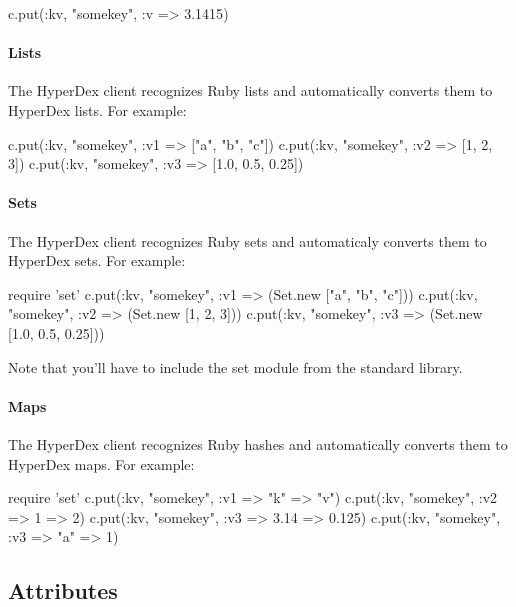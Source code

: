 \begin{rubycode}
c.put(:kv, "somekey", {:v => 3.1415})
\end{rubycode}

\paragraph{Lists}

The HyperDex client recognizes Ruby lists and automatically converts them to
HyperDex lists.  For example:

\begin{rubycode}
c.put(:kv, "somekey", {:v1 => ["a", "b", "c"]})
c.put(:kv, "somekey", {:v2 => [1, 2, 3]})
c.put(:kv, "somekey", {:v3 => [1.0, 0.5, 0.25]})
\end{rubycode}

\paragraph{Sets}

The HyperDex client recognizes Ruby sets and automaticaly converts them to
HyperDex sets.  For example:

\begin{rubycode}
require 'set'
c.put(:kv, "somekey", {:v1 => (Set.new ["a", "b", "c"])})
c.put(:kv, "somekey", {:v2 => (Set.new [1, 2, 3])})
c.put(:kv, "somekey", {:v3 => (Set.new [1.0, 0.5, 0.25])})
\end{rubycode}

Note that you'll have to include the set module from the standard library.

\paragraph{Maps}

The HyperDex client recognizes Ruby hashes and automatically converts them to
HyperDex maps.  For example:

\begin{rubycode}
require 'set'
c.put(:kv, "somekey", {:v1 => {"k" => "v"}})
c.put(:kv, "somekey", {:v2 => {1 => 2}})
c.put(:kv, "somekey", {:v3 => {3.14 => 0.125}})
c.put(:kv, "somekey", {:v3 => {"a" => 1}})
\end{rubycode}

\subsection{Attributes}
\label{sec:api:ruby:attributes}

